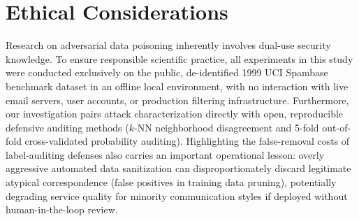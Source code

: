 \documentclass[10pt,conference]{IEEEtran}
\begin{document}
\section{Ethical Considerations}
Research on adversarial data poisoning inherently involves dual-use security knowledge. To ensure responsible scientific practice, all experiments in this study were conducted exclusively on the public, de-identified 1999 UCI Spambase benchmark dataset in an offline local environment, with no interaction with live email servers, user accounts, or production filtering infrastructure. Furthermore, our investigation pairs attack characterization directly with open, reproducible defensive auditing methods ($k$-NN neighborhood disagreement and 5-fold out-of-fold cross-validated probability auditing). Highlighting the false-removal costs of label-auditing defenses also carries an important operational lesson: overly aggressive automated data sanitization can disproportionately discard legitimate atypical correspondence (false positives in training data pruning), potentially degrading service quality for minority communication styles if deployed without human-in-the-loop review.



\end{document}
